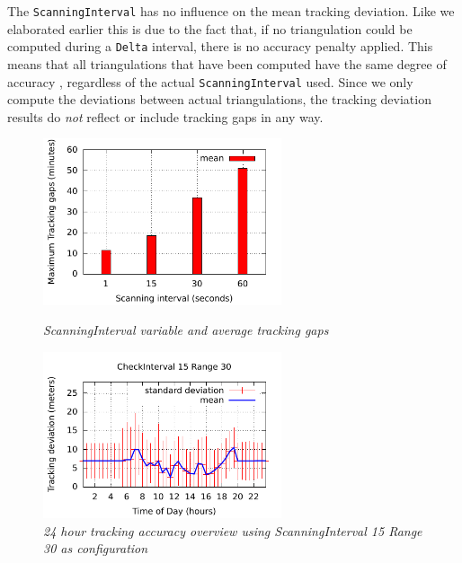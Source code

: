 \documentclass[10pt,titlepage]{article}
\begin{document}
The \texttt{ScanningInterval} has no influence on the mean tracking deviation. Like we elaborated earlier this is due to the fact that, if no triangulation could be computed during a \texttt{Delta} interval, there is no accuracy penalty applied. This means that all triangulations that have been computed have the same degree of accuracy , regardless of the actual \texttt{ScanningInterval} used. Since we only compute the deviations between actual triangulations, the tracking deviation results do \textit{not} reflect or include tracking gaps in any way.
















\begin{figure}[htb]
\begin{minipage}[b]{0.45\linewidth}
\centering
\includegraphics[width=7cm]{scanninginterval-timegap-total.pdf}
\caption{\textit{ScanningInterval variable and average tracking gaps}}
\label{fig:scanninginterval-timegap}
\end{minipage}
\hspace{0.5cm}
\begin{minipage}[b]{0.45\linewidth}
\centering
\includegraphics[width=7cm]{24-deviation-view.pdf}
\caption{\textit{24 hour tracking accuracy overview using ScanningInterval 15 Range 30 as configuration}}
\label{fig:24h-detail-view}

\end{minipage}
\end{figure}
\end{document}
